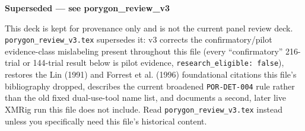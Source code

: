 \documentclass[aspectratio=169, 11pt]{beamer}
\begin{document}
\begin{frame}
    \centering
    \vspace{2cm}
    {\LARGE\bfseries\textcolor{amritaMaroon}{Superseded --- see porygon\_review\_v3}}\\[0.6cm]
    \begin{minipage}{0.8\textwidth}
        \small
        This deck is kept for provenance only and is not the current panel
        review deck. \texttt{porygon\_review\_v3.tex} supersedes it: v3
        corrects the confirmatory/pilot evidence-class mislabeling present
        throughout this file (every ``confirmatory'' 216-trial or 144-trial
        result below is pilot evidence, \texttt{research\_eligible: false}),
        restores the Lin (1991) and Forrest et al. (1996) foundational
        citations this file's bibliography dropped, describes the current
        broadened \texttt{POR-DET-004} rule rather than the old fixed
        dual-use-tool name list, and documents a second, later live XMRig
        run this file does not include. Read \texttt{porygon\_review\_v3.tex}
        instead unless you specifically need this file's historical content.
    \end{minipage}
\end{frame}
\end{document}
